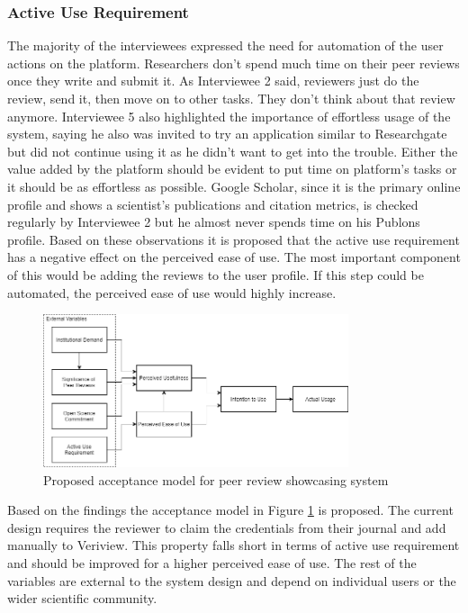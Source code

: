 \subsubsection{Active Use Requirement}

The majority of the interviewees expressed the need for automation of the user actions on the platform. Researchers don't spend much time on their peer reviews once they write and submit it. As Interviewee 2 said, reviewers just do the review, send it, then move on to other tasks. They don't think about that review anymore. Interviewee 5 also highlighted the importance of effortless usage of the system, saying he also was invited to try an application similar to Researchgate but did not continue using it as he didn't want to get into the trouble. Either the value added by the platform should be evident to put time on platform's tasks or it should be as effortless as possible. Google Scholar, since it is the primary online profile and shows a scientist's publications and citation metrics, is checked regularly by Interviewee 2 but he almost never spends time on his Publons profile. Based on these observations it is proposed that the active use requirement has a negative effect on the perceived ease of use. The most important component of this would be adding the reviews to the user profile. If this step could be automated, the perceived ease of use would highly increase.


\begin{figure}[htpb]
  \centering
  \includegraphics[width=0.8\textwidth]{figures/Proposed TAM.png}
  \caption{Proposed acceptance model for peer review showcasing system } \label{fig:proposed-tam}
\end{figure}

Based on the findings the acceptance model in Figure \ref{fig:proposed-tam} is proposed. The current design requires the reviewer to claim the credentials from their journal and add manually to Veriview. This property falls short in terms of active use requirement and should be improved for a higher perceived ease of use. The rest of the variables are external to the system design and depend on individual users or the wider scientific community. 